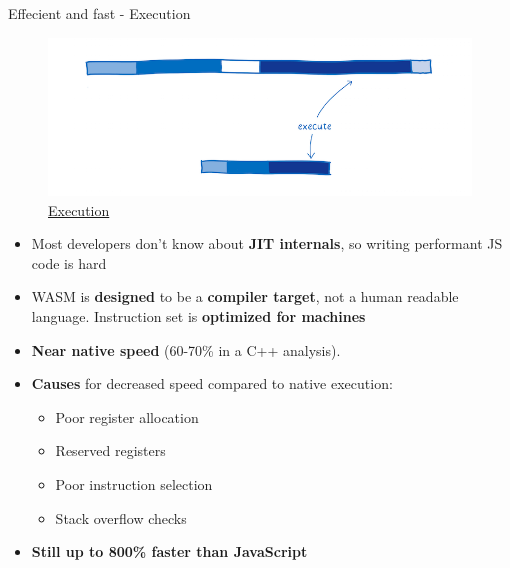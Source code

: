 \documentclass{beamer}
\begin{document}
\begin{frame}{Effecient and fast - Execution}
    \begin{figure}
        \includegraphics[scale=0.1]{./images/execution.png}
        \caption{\href{https://www.smashingmagazine.com/2017/05/abridged-cartoon-introduction-webassembly/}{Execution}}
    \end{figure}
    \begin{itemize}
        \item Most developers don't know about \textbf{JIT internals}, so writing performant JS code is hard
        \item WASM is \textbf{designed} to be a \textbf{compiler target}, not a human readable language. Instruction set is \textbf{optimized for machines}
        \item \textbf{Near native speed} (60-70\% in a C++ analysis). 
        \item \textbf{Causes} for decreased speed compared to native execution:
        \begin{itemize}
            \item Poor register allocation
            \item Reserved registers
            \item Poor instruction selection
            \item Stack overflow checks
        \end{itemize}
        \item \textbf{Still up to 800\% faster than JavaScript}
    \end{itemize}
\end{frame}
\end{document}
